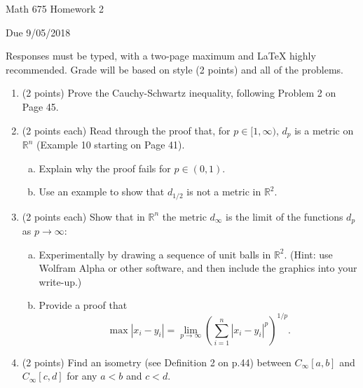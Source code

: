 \documentclass[12pt,letterpaper,reqno]{amsart}
\newcommand{\R}{\mathbb R}
\begin{document}
\thispagestyle{empty}
\centerline{\Large Math 675 Homework 2}
\centerline{Due 9/05/2018}
\vspace{.25in}

Responses must be typed, with a two-page maximum and LaTeX highly recommended. Grade will be based on style (2 points) and all of the problems.

\begin{enumerate}[1.]
\item (2 points) Prove the Cauchy-Schwartz inequality, following Problem 2 on Page 45.
\item (2 points each) Read through the proof that, for $p\in [1,\infty)$, $d_p$ is a metric on $\R^n$ (Example 10 starting on Page 41). 
\begin{enumerate}[(a)]
\item Explain why the proof fails for $p\in (0,1)$.
\item Use an example to show that $d_{1/2}$ is not a metric in $\R^2$.
\end{enumerate}

\item (2 points each) Show that in $\R^n$ the metric $d_\infty$ is the limit of the functions $d_p$ as $p\rightarrow \infty$:
\begin{enumerate}[(a)]
\item Experimentally by drawing a sequence of unit balls in $\R^2$. (Hint: use Wolfram Alpha or other software, and then include the graphics into your write-up.)
\item Provide a proof that $$\max |x_i-y_i|=\lim_{p\rightarrow \infty}\left(\sum_{i=1}^n |x_i-y_i|^p\right)^{1/p}.$$
\end{enumerate}
\item (2 points) Find an isometry (see Definition 2 on p.44) between $C_\infty[a,b]$ and $C_\infty[c,d]$ for any $a<b$ and $c<d$.
\end{enumerate}
\end{document}
